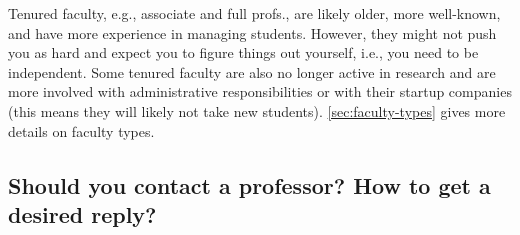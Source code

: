 \documentclass[oneside,11pt,dvipsnames]{book}
\newenvironment{commentbox}[1][]{
  \small
  \begin{mybox}
    {\small \textbf{#1}}
  }{
  \end{mybox}
}
\begin{document}
Tenured faculty, e.g., associate and full profs., are likely older, more well-known, and have more experience in managing students.  However, they might not push you as hard and expect you to figure things out yourself, i.e., you need to be independent.  Some tenured faculty are also no longer active in research and are more involved with administrative responsibilities or with their startup companies (this means they will likely not take new students). \autoref{sec:faculty-types} gives more details on faculty types.




\subsection{Should you contact a professor? How to get a desired reply?}\label{sec:contact}
\end{document}

